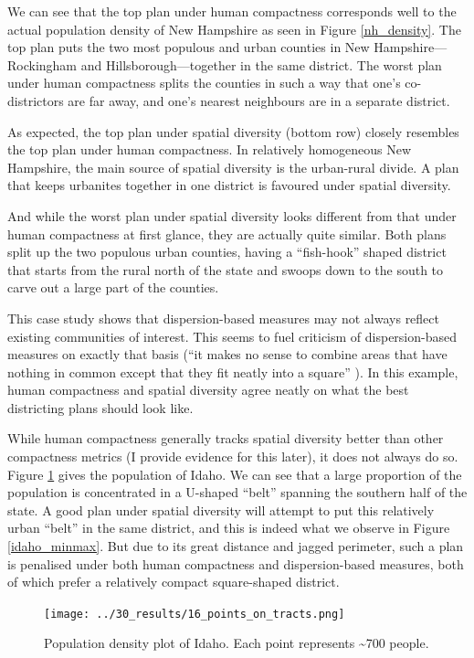 \documentclass[]{article}
\begin{document}
We can see that the top plan under human compactness corresponds well to
the actual population density of New Hampshire as seen in Figure
\ref{nh_density}. The top plan puts the two most populous and urban
counties in New Hampshire---Rockingham and Hillsborough---together in
the same district. The worst plan under human compactness splits the
counties in such a way that one's co-districtors are far away, and one's
nearest neighbours are in a separate district.

As expected, the top plan under spatial diversity (bottom row) closely
resembles the top plan under human compactness. In relatively
homogeneous New Hampshire, the main source of spatial diversity is the
urban-rural divide. A plan that keeps urbanites together in one district
is favoured under spatial diversity.

And while the worst plan under spatial diversity looks different from
that under human compactness at first glance, they are actually quite
similar. Both plans split up the two populous urban counties, having a
``fish-hook'' shaped district that starts from the rural north of the
state and swoops down to the south to carve out a large part of the
counties.

This case study shows that dispersion-based measures may not always
reflect existing communities of interest. This seems to fuel criticism
of dispersion-based measures on exactly that basis (``it makes no sense
to combine areas that have nothing in common except that they fit neatly
into a square'' \citep{wolf2015}). In this example, human compactness
and spatial diversity agree neatly on what the best districting plans
should look like.

While human compactness generally tracks spatial diversity better than
other compactness metrics (I provide evidence for this later), it does
not always do so. Figure \ref{idaho_density} gives the population of
Idaho. We can see that a large proportion of the population is
concentrated in a U-shaped ``belt'' spanning the southern half of the
state. A good plan under spatial diversity will attempt to put this
relatively urban ``belt'' in the same district, and this is indeed what
we observe in Figure \ref{idaho_minmax}. But due to its great distance
and jagged perimeter, such a plan is penalised under both human
compactness and dispersion-based measures, both of which prefer a
relatively compact square-shaped district.

\begin{figure}
\centering
\texttt{[image: ../30\_results/16\_points\_on\_tracts.png]}
\caption{Population density plot of Idaho. Each point represents
\textasciitilde{}700 people. \label{idaho_density}}
\end{figure}
\end{document}
